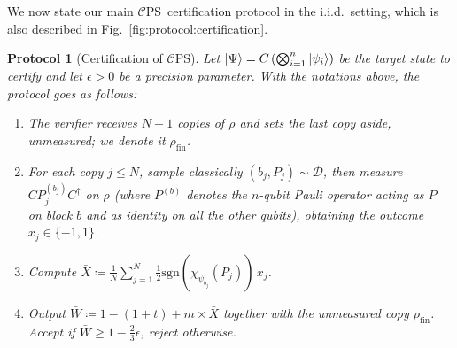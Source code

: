 \documentclass[a4paper,twocolumn,11pt,unpublished]{../../revision/quantumarticle}
\newtheorem{protocol}{Protocol}
\newcommand{\np}{m}
\newcommand{\CEPS}{$\mathcal C$PS}
\newcommand{\pdist}{\mathcal D} %
\newcommand{\copyindex}{j}
\newcommand{\qubit}{i}
\begin{document}
 
            We now state our main \CEPS\ certification protocol in the i.i.d.\ setting, which is also described in Fig.~\ref{fig:protocol:certification}.


        


        \begin{protocol}[Certification of \CEPS]
            \label{protocol:certification}
            Let $\ket\Psi = C\left(\bigotimes_{\qubit=1}^n\ket{\psi_\qubit}\right)$ be the target state to certify and let $\epsilon>0$ be a precision parameter. With the notations above, the protocol goes as follows:
            \begin{enumerate}
                \item The verifier receives $N+1$ copies of $\rho$ and sets the last copy aside, unmeasured; we denote it $\rho_{\mathrm{fin}}$.
                \item For each copy $\copyindex\leq N$, sample classically $(b_j, P_j)\sim \pdist$, then measure $C P_j^{(b_j)} C^\dagger$ on $\rho$ (where $P^{(b)}$ denotes the $n$-qubit Pauli operator acting as $P$ on block $b$ and as identity on all the other qubits), obtaining the outcome $x_j\in\{-1, 1\}$.
                \item Compute $\bar X \coloneqq \frac{1}{N}\sum_{\copyindex=1}^N \tfrac 1 2 \mathrm{sgn}(\chi_{\psi_{b_j}}(P_j)) \,x_j$.
                \item Output $\bar W\coloneqq 1-(1+t)+\np\times \bar X$ together with the unmeasured copy $\rho_{\mathrm{fin}}$. Accept if $\bar W\ge1-\frac{2}{3}\epsilon$, reject otherwise.
            \end{enumerate}
        \end{protocol}
\end{document}

